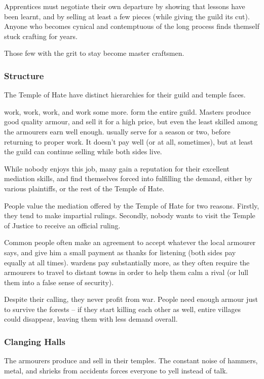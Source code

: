 \begin{multicols}{2}
Apprentices must negotiate their own departure by showing that lessons have been learnt, and by selling at least a few pieces (while giving the guild its cut).
Anyone who becomes cynical and contemptuous of the long process finds themself stuck crafting for years.

Those few with the grit to stay become master craftsmen.

\subsubsection{Structure}
The Temple of Hate have distinct hierarchies for their guild and temple faces.

\begin{description}
  work, work, work, and work some more.
  form the entire guild.
  Masters produce good quality armour, and sell it for a high price, but even the least skilled among the armourers earn well enough.
  usually serve for a season or two, before returning to proper work.
  It doesn't pay well (or at all, sometimes), but at least the guild can continue selling while both sides live.

  While nobody enjoys this job, many gain a reputation for their excellent mediation skills, and find themselves forced into fulfilling the demand, either by various plaintiffs, or the rest of the Temple of Hate.
\end{description}

\noindent
People value the mediation offered by the Temple of Hate for two reasons.
Firstly, they tend to make impartial rulings.
Secondly, nobody wants to visit the Temple of Justice to receive an official ruling.

Common people often make an agreement to accept whatever the local armourer says, and give him a small payment as thanks for listening (both sides pay equally at all times).
\Glspl{warden} pay substantially more, as they often require the armourers to travel to distant towns in order to help them calm a rival (or lull them into a false sense of security).

Despite their calling, they never profit from war.
People need enough armour just to survive the forests -- if they start killing each other as well, entire \glspl{village} could disappear, leaving them with less demand overall.

\subsubsection{Clanging Halls}
The armourers produce and sell in their temples.
The constant noise of hammers, metal, and shrieks from accidents forces everyone to yell instead of talk.


\end{multicols}
